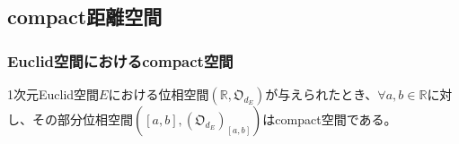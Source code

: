\documentclass[dvipdfmx]{jsarticle}
\begin{document}
\subsection{compact距離空間}%
\subsubsection{Euclid空間におけるcompact空間}%
\begin{thm}\label{8.2.5.1}
1次元Euclid空間$E$における位相空間$\left( \mathbb{R},\mathfrak{O}_{d_{E}} \right)$が与えられたとき、$\forall a,b \in \mathbb{R}$に対し、その部分位相空間$\left( [ a,b],\left( \mathfrak{O}_{d_{E}} \right)_{[ a,b]} \right)$はcompact空間である。
\end{thm}
\end{document}
